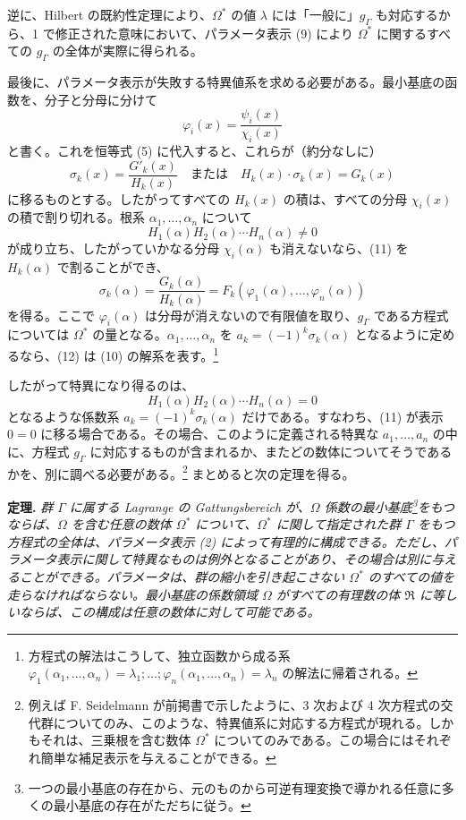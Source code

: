 逆に、Hilbert の既約性定理により、$\Omega^*$ の値 $\lambda$ には「一般に」$g_\Gamma$ も対応するから、1 で修正された意味において、パラメータ表示 (9) により $\Omega^*$ に関するすべての $g_\Gamma$ の全体が実際に得られる。

最後に、パラメータ表示が失敗する特異値系を求める必要がある。最小基底の函数を、分子と分母に分けて
\[
\varphi_i(x)=\frac{\psi_i(x)}{\chi_i(x)}
\]
と書く。これを恒等式 (5) に代入すると、これらが（約分なしに）
\begin{equation}\tag{11}
\sigma_k(x)=\frac{G'_k(x)}{H_k(x)}\quad\text{または}\quad H_k(x)\cdot\sigma_k(x)=G_k(x)
\end{equation}
に移るものとする。したがってすべての $H_k(x)$ の積は、すべての分母 $\chi_i(x)$ の積で割り切れる。根系 $\alpha_1,
\ldots,\alpha_n$ について
\[
H_1(\alpha)H_2(\alpha)\cdots H_n(\alpha)\ne0
\]
が成り立ち、したがっていかなる分母 $\chi_i(\alpha)$ も消えないなら、(11) を $H_k(\alpha)$ で割ることができ、
\begin{equation}\tag{12}
\sigma_k(\alpha)=\frac{G_k(\alpha)}{H_k(\alpha)}=F_k(\varphi_1(\alpha),\ldots,\varphi_n(\alpha))
\end{equation}
を得る。ここで $\varphi_i(\alpha)$ は分母が消えないので有限値を取り、$g_\Gamma$ である方程式については $\Omega^*$ の量となる。$\alpha_1,
\ldots,\alpha_n$ を $a_k=(-1)^k\sigma_k(\alpha)$ となるように定めるなら、(12) は (10) の解系を表す。\footnote{方程式の解法はこうして、独立函数から成る系
$\varphi_1(\alpha_1,
\ldots,\alpha_n)=\lambda_1;\ldots;\varphi_n(\alpha_1,
\ldots,\alpha_n)=\lambda_n$
の解法に帰着される。}

したがって特異になり得るのは、
\[
H_1(\alpha)H_2(\alpha)\cdots H_n(\alpha)=0
\]
となるような係数系 $a_k=(-1)^k\sigma_k(\alpha)$ だけである。すなわち、(11) が表示 $0=0$ に移る場合である。その場合、このように定義される特異な $a_1,
\ldots,a_n$ の中に、方程式 $g_\Gamma$ に対応するものが含まれるか、またどの数体についてそうであるかを、別に調べる必要がある。\footnote{例えば F. Seidelmann が前掲書で示したように、3 次および 4 次方程式の交代群についてのみ、このような、特異値系に対応する方程式が現れる。しかもそれは、三乗根を含む数体 $\Omega^*$ についてのみである。この場合にはそれぞれ簡単な補足表示を与えることができる。} まとめると次の定理を得る。

\smallskip
\noindent\textbf{定理.} \emph{群 $\Gamma$ に属する Lagrange の \emph{Gattungsbereich} が、$\Omega$ 係数の最小基底\footnote{一つの最小基底の存在から、元のものから可逆有理変換で導かれる任意に多くの最小基底の存在がただちに従う。}をもつならば、$\Omega$ を含む任意の数体 $\Omega^*$ について、$\Omega^*$ に関して指定された群 $\Gamma$ をもつ方程式の全体は、パラメータ表示 (2) によって有理的に構成できる。ただし、パラメータ表示に関して特異なものは例外となることがあり、その場合は別に与えることができる。パラメータは、群の縮小を引き起こさない $\Omega^*$ のすべての値を走らなければならない。最小基底の係数領域 $\Omega$ がすべての有理数の体 $\mathfrak R$ に等しいならば、この構成は任意の数体に対して可能である。}

